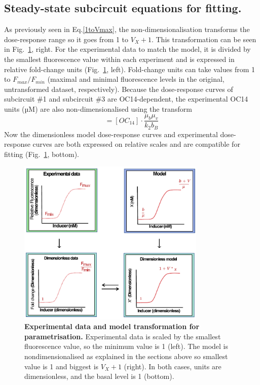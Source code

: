 \subsection{Steady-state subcircuit equations for fitting.}
As previously seen in Eq.\ref{1toVmax},
the non-dimensionalisation transforms the dose-response range so it goes from 1 to $V_{X}+1$.
This transformation can be seen in Fig.~\ref{fig:dose_response_transforms}, right.
For the experimental data to match the model,
it is divided by the smallest fluorescence value within each experiment and is expressed in relative fold-change units
(Fig.~\ref{fig:dose_response_transforms}, left).
Fold-change units can take values from 1 to $F_{max}/F_{min}$
(maximal and minimal fluorescence levels in the original, untransformed dataset, respectively).
Because the dose-response curves of subcircuit \#1 and subcircuit \#3 are OC14-dependent, the experimental OC14 units (µM) are also non-dimensionalised using the transform
\begin{equation}
    [B*]=[OC_{14}] \cdot \frac{\mu_{b}\mu_{v}}{k_{2}b_{B}}
    \label{Btransform}
\end{equation}
Now the dimensionless model dose-response curves and experimental dose-response curves are both expressed on relative scales and are compatible for fitting (Fig.~\ref{fig:dose_response_transforms}, bottom).
\begin{figure}[H] %
    \centering
    \begin{adjustbox}{center}
        \includegraphics[width=0.8\textwidth]{chapters/Chapter 2/dose_response_transforms}
    \end{adjustbox}
    \caption{\textbf{Experimental data and model transformation for parametrisation.} Experimental data is scaled by the smallest fluorescence value, so the minimum value is 1 (left). The model is nondimensionalised
    as explained in the sections above so smallest value is 1
    and biggest is $V_{X} +1$ (right).
    In both cases, units are dimensionless, and the basal level is 1 (bottom).}
    \label{fig:dose_response_transforms}
\end{figure}


